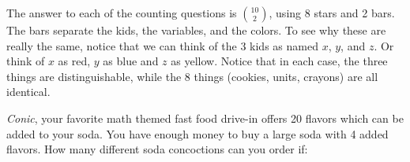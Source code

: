 \begin{questions}



	\begin{answer}
	  The answer to each of the counting questions is ${10 \choose 2}$, using 8 stars and 2 bars.  The bars separate the kids, the variables, and the colors.  To see why these are really the same, notice that we can think of the 3 kids as named $x$, $y$, and $z$.  Or think of $x$ as red, $y$ as blue and $z$ as yellow.  Notice that in each case, the three things are distinguishable, while the 8 things (cookies, units, crayons) are all identical.
	\end{answer}




\question \textit{Conic}, your favorite math themed fast food drive-in offers 20 flavors which can be added to your soda.  You have enough money to buy a large soda with 4 added flavors.  How many different soda concoctions can you order if:

  \begin{answer}
\end{answer}
\end{questions}

